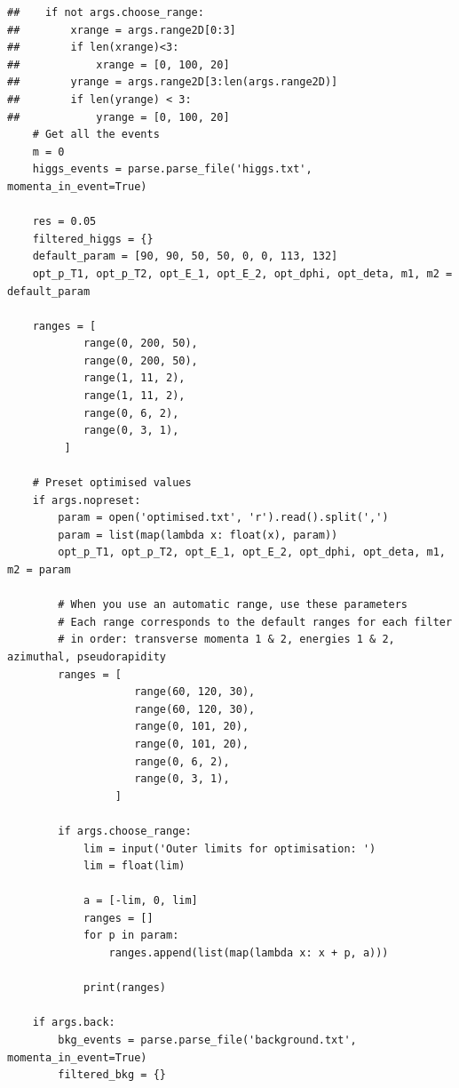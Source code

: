 \documentclass{article}
\begin{document}
\begin{lstlisting}
##    if not args.choose_range:
##        xrange = args.range2D[0:3]
##        if len(xrange)<3:
##            xrange = [0, 100, 20]
##        yrange = args.range2D[3:len(args.range2D)]
##        if len(yrange) < 3:
##            yrange = [0, 100, 20]
    # Get all the events
    m = 0
    higgs_events = parse.parse_file('higgs.txt', momenta_in_event=True)

    res = 0.05
    filtered_higgs = {}
    default_param = [90, 90, 50, 50, 0, 0, 113, 132]
    opt_p_T1, opt_p_T2, opt_E_1, opt_E_2, opt_dphi, opt_deta, m1, m2 = default_param

    ranges = [
            range(0, 200, 50),
            range(0, 200, 50),
            range(1, 11, 2),
            range(1, 11, 2),
            range(0, 6, 2),
            range(0, 3, 1),
         ]

    # Preset optimised values
    if args.nopreset:
        param = open('optimised.txt', 'r').read().split(',')
        param = list(map(lambda x: float(x), param))
        opt_p_T1, opt_p_T2, opt_E_1, opt_E_2, opt_dphi, opt_deta, m1, m2 = param

        # When you use an automatic range, use these parameters
        # Each range corresponds to the default ranges for each filter
        # in order: transverse momenta 1 & 2, energies 1 & 2, azimuthal, pseudorapidity
        ranges = [
                    range(60, 120, 30),
                    range(60, 120, 30),
                    range(0, 101, 20),
                    range(0, 101, 20),
                    range(0, 6, 2),
                    range(0, 3, 1),
                 ]

        if args.choose_range:
            lim = input('Outer limits for optimisation: ')
            lim = float(lim)

            a = [-lim, 0, lim]
            ranges = []
            for p in param:
                ranges.append(list(map(lambda x: x + p, a)))

            print(ranges)

    if args.back:
        bkg_events = parse.parse_file('background.txt', momenta_in_event=True)
        filtered_bkg = {}


\end{lstlisting}
\end{document}
